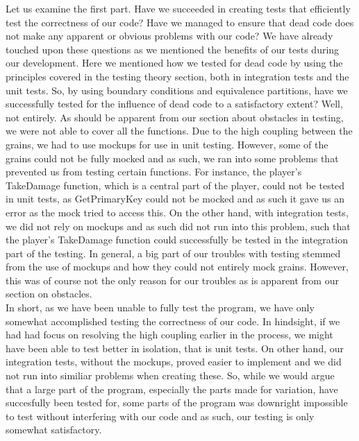 Let us examine the first part. Have we succeeded in creating tests that efficiently test the correctness of our code? Have we managed to ensure that dead code does not make any apparent or obvious problems with our code? We have already touched upon these questions as we mentioned the benefits of our tests during our development. Here we mentioned how we tested for dead code by using the principles covered in the testing theory section, both in integration tests and the unit tests. So, by using boundary conditions and equivalence partitions, have we successfully tested for the influence of dead code to a satisfactory extent? Well, not entirely. As should be apparent from our section about obstacles in testing, we were not able to cover all the functions. Due to the high coupling between the grains, we had to use mockups for use in unit testing. However, some of the grains could not be fully mocked and as such, we ran into some problems that prevented us from testing certain functions. For instance, the player's TakeDamage function, which is a central part of the player, could not be tested in unit tests, as GetPrimaryKey could not be mocked and as such it gave us an error as the mock tried to access this. On the other hand, with integration tests, we did not rely on mockups and as such did not run into this problem, such that the player's TakeDamage function could successfully be tested in the integration part of the testing. In general, a big part of our troubles with testing stemmed from the use of mockups and how they could not entirely mock grains. However, this was of course not the only reason for our troubles as is apparent from our section on obstacles. \\
In short, as we have been unable to fully test the program, we have only somewhat accomplished testing the correctness of our code. In hindsight, if we had had focus on resolving the high coupling earlier in the process, we might have been able to test better in isolation, that is unit tests. On other hand, our integration tests, without the mockups, proved easier to implement and we did not run into similiar problems when creating these. So, while we would argue that a large part of the program, especially the parts made for variation, have succesfully been tested for, some parts of the program was downright impossible to test without interfering with our code and as such, our testing is only somewhat satisfactory. \\
\\

